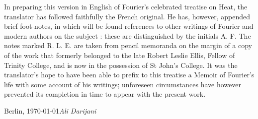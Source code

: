 %
%
\preface


In preparing this version in English of Fourier's celebrated treatise on Heat, the translator has followed
faithfully the French original. He has, however, appended brief foot-notes, in which will be found references 
to other writings of Fourier and modern authors on the subject : these are distinguished by the initials A. F.
 The notes marked R. L. E. are taken from pencil memoranda on the margin of a copy of the work that formerly 
 belonged to the late Robert Leslie Ellis, Fellow of Trinity College, and is now in the possession of St John's
  College. It was the translator's hope to have been able to prefix to this treatise a Memoir of Fourier's 
  life with some account of his writings; unforeseen circumstances have however prevented its completion in 
  time to appear with the present work.

\vspace{\baselineskip}
\begin{flushright}\noindent
Berlin, \today \hfill {\it Ali Darijani}\\
\end{flushright}
